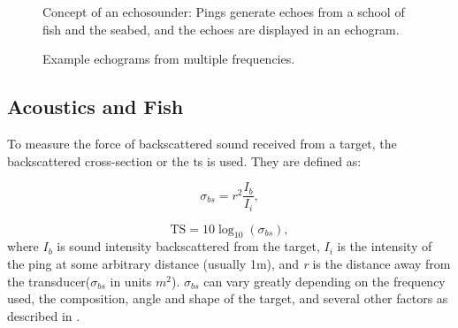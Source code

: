     
    \begin{figure}[H]
        \centering
            
        \caption[Echosounder]{Concept of an echosounder: Pings generate echoes from a school of fish and the seabed, and the echoes are displayed in an echogram.}
      	\medskip 
        \label{echogram}
    \end{figure}
    
    \begin{figure}[H]
        \centering
            
        \caption[Echosounder]{Example echograms from multiple frequencies.}
      	\medskip 
        \label{echogram_example_fig}
    \end{figure}

    
\subsection{Acoustics and Fish}
    To measure the force of backscattered sound received from a target, the backscattered cross-section or the \gls{ts} is used. They are defined as:
    
    \begin{equation}
        \sigma_{bs} = r^{2}\frac{I_{b}}{I_{i}},
    \end{equation}
    

    \begin{equation}
        \textrm{TS} = 10 \log_{10}(\sigma_{bs}),
    \end{equation}
    where $I_{b}$ is sound intensity backscattered from the target, $I_{i}$ is the intensity of the ping at some arbitrary distance (usually 1m), and \textit{r} is the distance away from the transducer($\sigma_{bs}$ in units $m^{2}$). $\sigma_{bs}$ can vary greatly depending on the frequency used, the composition, angle and shape of the target, and several other factors as described in \citet{simmonds2008fisheries}. 


